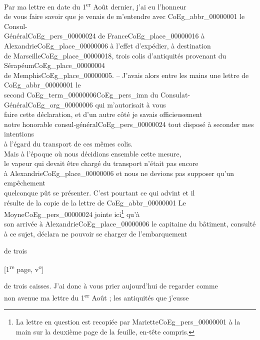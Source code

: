 \documentclass{book}
\begin{document}
\indent Par ma lettre en date du 1\textsuperscript{er} Août dernier, j’ai eu l’honneur\\
de vous faire savoir que je venais de m’entendre avec \gls{CoEg_abbr_00000001} le Consul-\\
Général\gls{CoEg_pers_00000024} de France\gls{CoEg_place_00000016} à Alexandrie\gls{CoEg_place_00000006} à l’effet d’expédier, à destination\\
de Marseille\gls{CoEg_place_00000018}, trois colis d’antiquités provenant du Sérapéum\gls{CoEg_place_00000004}\\
de Memphis\gls{CoEg_place_00000005}. – J’avais alors entre les mains une lettre de \gls{CoEg_abbr_00000001} le\\
second \gls{CoEg_term_00000006}\gls{CoEg_pers_imn} du Consulat-Général\gls{CoEg_org_00000006} qui m’autorisait à vous\\
faire cette déclaration, et d’un autre côté je savais officieusement\\
notre honorable consul-général\gls{CoEg_pers_00000024} tout disposé à seconder mes intentions\\
à l’égard du transport de ces mêmes colis.\\
\indent Mais à l’époque où nous décidions ensemble cette mesure,\\
le vapeur qui devait être chargé du transport n’était pas encore\\
à Alexandrie\gls{CoEg_place_00000006} et nous ne devions pas supposer qu’un empêchement\\
quelconque pût se présenter. C’est pourtant ce qui advint et il\\
résulte de la copie de la lettre de \gls{CoEg_abbr_00000001} Le Moyne\gls{CoEg_pers_00000024} jointe ici\footnote{La lettre en question est recopiée par Mariette\gls{CoEg_pers_00000001} à la main sur la deuxième page de la feuille, en-tête compris.} qu’à\\
son arrivée à Alexandrie\gls{CoEg_place_00000006} le capitaine du bâtiment, consulté\\
à ce sujet, déclara ne pouvoir se charger de l’embarquement
\begin{flushright}de trois\end{flushright}
{\footnotesize \begin{center} {[1\textsuperscript{re} page, v\textsuperscript{o}]}\end{center}}
de trois caisses. J’ai donc à vous prier aujourd’hui de regarder comme\\
non avenue ma lettre du 1\textsuperscript{er} Août ; les antiquités que j’eusse\\
\end{document}
